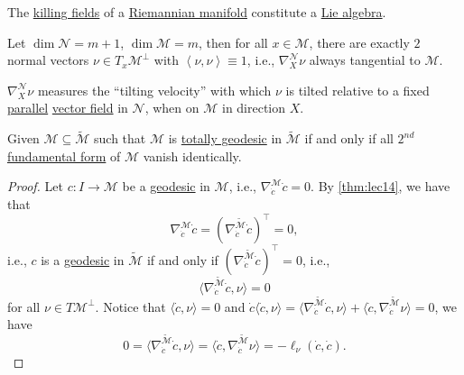 \begin{lemma}
	The \hyperref[def:killing-field]{killing fields} of a \hyperref[def:Riemannian-manifold]{Riemannian manifold} constitute a \hyperref[def:Lie-algebra]{Lie algebra}.
\end{lemma}

Let \(\dim \mathcal{N} = m+1\), \(\dim \mathcal{M} = m\), then for all \(x\in \mathcal{M} \), there are exactly \(2\) normal vectors \(\nu \in T_x \mathcal{M} ^{\perp} \) with \(\left\langle \nu, \nu \right\rangle \equiv 1\), i.e., \(\nabla _X^{\mathcal{N} } \nu \) always tangential to \(\mathcal{M} \).

\begin{remark}
	\(\nabla _X^{\mathcal{N} } \nu \) measures the ``tilting velocity'' with which \(\nu \) is tilted relative to a fixed \hyperref[def:parallel]{parallel} \hyperref[def:vector-field]{vector field} in \(\mathcal{N} \), when on \(\mathcal{M} \) in direction \(X\).
\end{remark}

\begin{theorem}\label{thm:lec15}
	Given \(\mathcal{M} \subseteq \widetilde{\mathcal{M}} \) such that \(\mathcal{M} \) is \hyperref[def:totally-geodesic]{totally geodesic} in \(\widetilde{\mathcal{M}} \) if and only if all \hyperref[def:2nd-fundamental-form]{\(2^{nd} \) fundamental form} of \(\mathcal{M} \) vanish identically.
\end{theorem}
\begin{proof}
	Let \(c\colon I \to \mathcal{M} \) be a \hyperref[def:geodesic]{geodesic} in \(\mathcal{M} \), i.e., \(\nabla _{\dot{c} }^{\mathcal{M}} \dot{c} = 0\). By \autoref{thm:lec14}, we have that
	\[
		\nabla _{\dot{c} }^{\mathcal{M}} \dot{c} = (\nabla _{\dot{c} }^{\widetilde{\mathcal{M}} } \dot{c} )^{\top} = 0 ,
	\]
	i.e., \(c\) is a \hyperref[def:geodesic]{geodesic} in \(\widetilde{\mathcal{M}} \) if and only if \((\nabla _{\dot{c} }^{\widetilde{\mathcal{M}} } \dot{c} )^{\top} = 0\), i.e.,
	\[
		\langle \nabla _{\dot{c} }^{\widetilde{\mathcal{M}} } \dot{c} , \nu \rangle = 0
	\]
	for all \(\nu \in T \mathcal{M} ^{\perp} \). Notice that \(\langle \dot{c} , \nu \rangle = 0\) and \(\dot{c} \langle \dot{c} , \nu \rangle = \langle \nabla _{\dot{c} }^{\widetilde{\mathcal{M}} } \dot{c} , \nu \rangle + \langle \dot{c} , \nabla _{\dot{c} }^{\widetilde{\mathcal{M}} } \nu \rangle = 0\), we have
	\[
		0 = \langle \nabla _{\dot{c}}^{\widetilde{\mathcal{M}} } \dot{c} , \nu \rangle
		= \langle \dot{c} , \nabla _{\dot{c} }^{\widetilde{\mathcal{M}} } \nu \rangle
		= -\ell _{\nu } (\dot{c}, \dot{c} ).
	\]
\end{proof}

